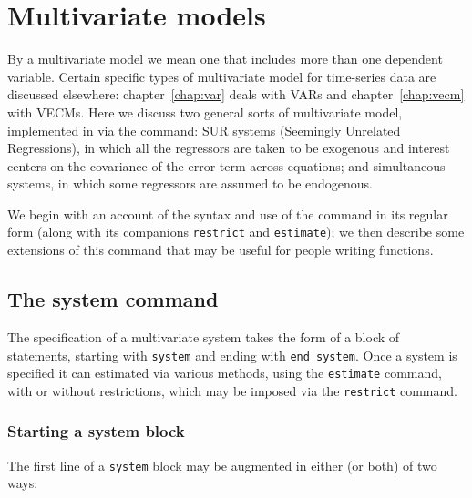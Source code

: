 \chapter{Multivariate models}
\label{chap:system}

By a multivariate model we mean one that includes more than one
dependent variable. Certain specific types of multivariate model for
time-series data are discussed elsewhere: chapter~\ref{chap:var} deals
with VARs and chapter~\ref{chap:vecm} with VECMs. Here we discuss two
general sorts of multivariate model, implemented in  via
the  command: SUR systems (Seemingly Unrelated
Regressions), in which all the regressors are taken to be exogenous
and interest centers on the covariance of the error term across
equations; and simultaneous systems, in which some regressors are
assumed to be endogenous.

We begin with an account of the syntax and use of the 
command in its regular form (along with its companions
\texttt{restrict} and \texttt{estimate}); we then describe some
extensions of this command that may be useful for people writing
functions.

\section{The system command}
\label{sec:system-regular}

The specification of a multivariate system takes the form of a block
of statements, starting with \texttt{system} and ending with
\texttt{end system}. Once a system is specified it can estimated via
various methods, using the \texttt{estimate} command, with or without
restrictions, which may be imposed via the \texttt{restrict} command.

\subsection{Starting a system block}

The first line of a \texttt{system} block may be augmented in either
(or both) of two ways:

